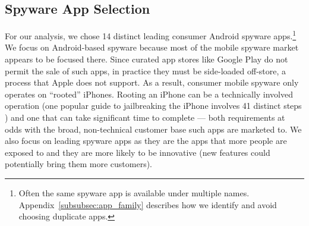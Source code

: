 \subsection{Spyware App Selection}
\label{subsec:app_selection}



For our analysis, we chose 14 distinct leading consumer Android spyware
apps.\footnote{Often the same spyware app is available under multiple
  names.  Appendix~\ref{subsubsec:app_family} describes how we
  identify and avoid choosing duplicate apps.}  We focus on
Android-based spyware because most of the mobile spyware market
appears to be focused there. Since curated app stores like Google Play do not permit
the sale of such apps, in practice they must be side-loaded off-store, a process
that Apple does not support.  As a result, consumer mobile spyware only operates on ``rooted'' iPhones.  Rooting an iPhone can be a
technically involved operation (one popular guide to jailbreaking the
iPhone involves 41 distinct steps \cite{howToJailbreakIphone:online}) and one that can take significant
time to complete --- both requirements at odds with the broad,
non-technical customer base such apps are marketed to. We also focus on leading spyware apps as they are the apps that more people are exposed to and they are more likely to be innovative (new features could potentially bring them more customers).


